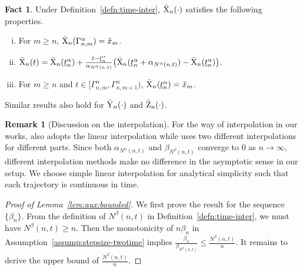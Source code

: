 \documentclass[11pt]{article}
\theoremstyle{plain}
\theoremstyle{definition}
\newtheorem{fact}{Fact}[section]
\newtheorem{rema}{Remark}[section]
\newcommand{\xcheck}{{\check{x}}}
\newcommand{\xbar}{{\bar{\textnormal{X}}}}
\newcommand{\ybar}{{\bar{\textnormal{Y}}}}
\newcommand{\zbar}{{\bar{\textnormal{Z}}}}
\begin{document}
\begin{appendix}
\begin{fact}\label{fact2}
Under Definition~\ref{defn:time-inter},
    $\xbar_{n}(\cdot)$	
satisfies the following properties.
\begin{enumerate}[(i)]
    \item For $m \ge n$, $ \xbar_{n}(\Gamma^\alpha_{n, m} ) = \xcheck_{m}$.
    \item 	$\xbar_{n}(t) = \xbar_{n}( \underline{t}_n^\alpha ) + \frac{t - \underline{t}^\alpha_{n}}{ \alpha_{N^\alpha(n,t)} } \big(  \xbar_{n}( \underline{t}_n^\alpha + \alpha_{N^\alpha(n,t)} ) - \xbar_{n}( \underline{t}_n^\alpha ) \big)$.
    \item \label{fact2-3} For $m \ge n$ and $t \in [\Gamma^\alpha_{n,m}, \Gamma^\alpha_{n,m+1})$, $\xbar_{n}(\underline{t}^\alpha_{n}) = \xcheck_{m}$.
\end{enumerate}
Similar results also hold for $\ybar_{n}(\cdot)$ and $\zbar_{n}(\cdot)$.
\end{fact}

\begin{rema}[Discussion on the interpolation]
For the way of interpolation in our works, \cite{faizal2023functional} also adopts the linear interpolation while \cite{gadat2018stochastic, liang2023asymptotic, blanchet2024limit} uses two different interpolations for different parts.
Since both $\alpha_{N^\alpha(n,t)}$ and $\beta_{N^\beta(n,t)}$ converge to $0$ as $n \to \infty$, different interpolation methods make no difference in the asymptotic sense in our setup. We choose simple linear interpolation for analytical simplicity such that each trajectory is continuous in time.
\end{rema}




\begin{proof}[Proof of Lemma~\ref{lem:aux:bounded}]
We first prove the result for the sequence $\{ \beta_{n} \}$.
From the definition of $N^\beta(n,t)$ in Definition~\ref{defn:time-inter}, we must have $N^\beta(n,t) \ge n$.
Then the monotonicity of $n \beta_{n}$ in Assumption~\ref{assump:stepsize-twotime} implies $\frac{\beta_{n}}{ \beta_{ N^\beta(n,t) } } \le \frac{ N^\beta(n,t) }{n}$. It remains to derive the upper bound of $\frac{ N^\beta(n,t) }{n} $.


\end{proof}
\end{appendix}
\end{document}
